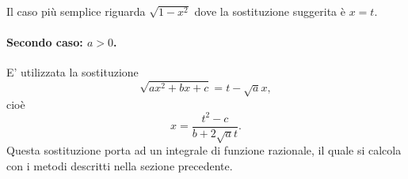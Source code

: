 \begin{example}
    Il caso più semplice riguarda $\sqrt{1-x^2}$ dove la sostituzione suggerita è $x=t$.
\end{example}

\paragraph{Secondo caso: $a>0$.} E' utilizzata la sostituzione
\begin{equation*}
    \sqrt{ax^2+bx+c}=t-\sqrt{a}x,
\end{equation*}
cioè
\begin{equation*}
    x=\frac{t^2-c}{b+2\sqrt{a}t}.
\end{equation*}
Questa sostituzione porta ad un integrale di funzione razionale, il quale si calcola con i metodi descritti nella sezione precedente.